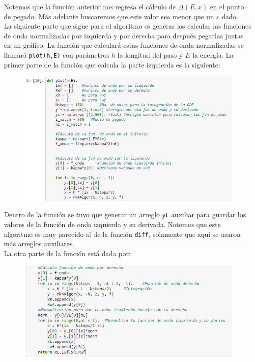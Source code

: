 \documentclass[11pt]{article}
\begin{document}
	 Notemos que la función anterior nos regresa el cálculo de $\Delta (E,x)$ en el punto de pegado. Más adelante buscaremos que este valor sea menor que un $\varepsilon$ dado.\\
	 La siguiente parte que sigue para el algoritmo es generar los calcular las funciones de onda normalizadas por izquierda y por derecha para después pegarlas juntas en un gráfico. La función que calculará estas funciones de onda normalizadas se llamará \texttt{plot(h,E)} con parámetros $h$ la longitud del paso y $E$ la energía. La primer parte de la función que calcula la parte izquierda es la siguiente:
	 \begin{figure}[h]
	 	\centering
	 	\includegraphics[width=13cm]{Img/2.9.PNG}
	 \end{figure}
 	
 	Dentro de la función se tuvo que generar un arreglo \texttt{yL} auxiliar para guardar los valores de la función de onda izquierda y su derivada. Notemos que este algoritmo es muy parecido al de la función \texttt{diff}, solamente que aquí se usaron más arreglos auxiliares.\\
 	La otra parte de la función está dada por:
\newpage
 	\begin{figure}[h]
 		\centering
 		\includegraphics[width=13cm]{Img/2.10.PNG}
 	\end{figure}
 	
\end{document}
